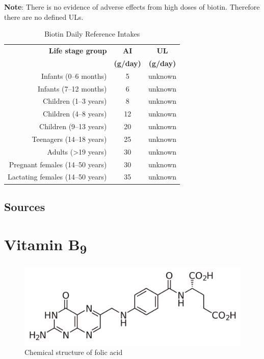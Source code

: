\documentclass{book}
\begin{document}
\begin{sloppypar}
\textbf{Note}: There is no evidence of adverse effects from high doses of biotin. Therefore there are no defined ULs.

\begin{table}[ht]
	\caption{Biotin Daily Reference Intakes}
	\centering \begin{tabular}{| r | c | c |}
		\hline
		\textbf{Life stage group} & \textbf{AI} & \textbf{UL}\\
		& \textbf{(\textmu g/day)} & \textbf{(\textmu g/day)}\\ \hline
		Infants (0--6 months) & 5 & unknown\\ \hline
		Infants (7--12 months) & 6 & unknown\\ \hline
		Children (1--3 years) & 8 & unknown\\ \hline
		Children (4--8 years) & 12 & unknown\\ \hline
		Children (9--13 years) & 20 & unknown\\ \hline
		Teenagers (14--18 years) & 25 & unknown\\ \hline
		Adults (\textgreater19 years) & 30 & unknown\\ \hline
		Pregnant females (14--50 years) & 30 & unknown\\ \hline
		Lactating females (14--50 years) & 35 & unknown\\ \hline
	\end{tabular}
\end{table}
\newpage

\section{Sources}


\chapter{Vitamin B\texorpdfstring{\textsubscript{9}}{9}}
\begin{figure}[h]
	\caption{Chemical structure of folic acid}
	\centering \includegraphics[width=\textwidth]{images/Vitamin_B9_chemical_structure}
\end{figure}
\newpage


\end{sloppypar}
\end{document}
